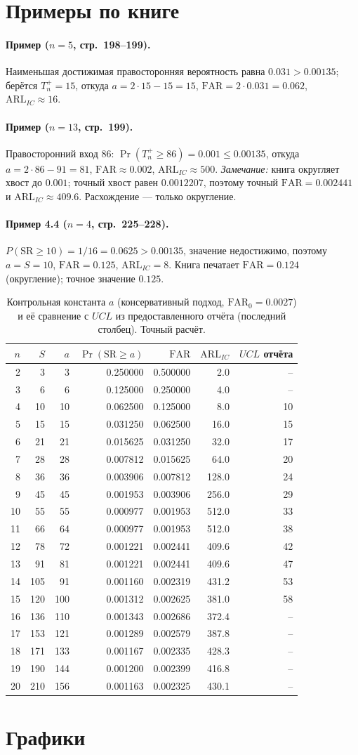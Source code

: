 \documentclass[11pt,a4paper]{article}
\newcommand{\SR}{\mathrm{SR}}
\newcommand{\FAR}{\mathrm{FAR}}
\newcommand{\ARL}{\mathrm{ARL}}
\newcommand{\FARz}{\FAR_0}
\def\srTable{%
2 & 3 & 3 & 0.250000 & 0.500000 & 2.0 & --\\
3 & 6 & 6 & 0.125000 & 0.250000 & 4.0 & --\\
4 & 10 & 10 & 0.062500 & 0.125000 & 8.0 & 10\\
5 & 15 & 15 & 0.031250 & 0.062500 & 16.0 & 15\\
6 & 21 & 21 & 0.015625 & 0.031250 & 32.0 & 17\\
7 & 28 & 28 & 0.007812 & 0.015625 & 64.0 & 20\\
8 & 36 & 36 & 0.003906 & 0.007812 & 128.0 & 24\\
9 & 45 & 45 & 0.001953 & 0.003906 & 256.0 & 29\\
10 & 55 & 55 & 0.000977 & 0.001953 & 512.0 & 33\\
11 & 66 & 64 & 0.000977 & 0.001953 & 512.0 & 38\\
12 & 78 & 72 & 0.001221 & 0.002441 & 409.6 & 42\\
13 & 91 & 81 & 0.001221 & 0.002441 & 409.6 & 47\\
14 & 105 & 91 & 0.001160 & 0.002319 & 431.2 & 53\\
15 & 120 & 100 & 0.001312 & 0.002625 & 381.0 & 58\\
16 & 136 & 110 & 0.001343 & 0.002686 & 372.4 & --\\
17 & 153 & 121 & 0.001289 & 0.002579 & 387.8 & --\\
18 & 171 & 133 & 0.001167 & 0.002335 & 428.3 & --\\
19 & 190 & 144 & 0.001200 & 0.002399 & 416.8 & --\\
20 & 210 & 156 & 0.001163 & 0.002325 & 430.1 & --\\}
\begin{document}
\section{Примеры по книге}

\paragraph{Пример ($n=5$, стр.~198--199).}
Наименьшая достижимая правосторонняя вероятность равна $0.031>0.00135$;
берётся $T_n^{+}=15$, откуда $a=2\cdot15-15=15$,
$\FAR=2\cdot0.031=0.062$, $\ARL_{IC}\approx16$.

\paragraph{Пример ($n=13$, стр.~199).}
Правосторонний вход $86$: $\Pr(T_n^{+}\ge86)=0.001\le0.00135$, откуда
$a=2\cdot86-91=81$, $\FAR\approx0.002$, $\ARL_{IC}\approx500$.
\emph{Замечание:} книга округляет хвост до $0.001$; точный хвост равен
$0.0012207$, поэтому точный $\FAR=0.002441$ и
$\ARL_{IC}\approx409.6$. Расхождение --- только округление.

\paragraph{Пример 4.4 ($n=4$, стр.~225--228).}
$P(\SR\ge10)=1/16=0.0625>0.00135$, значение недостижимо, поэтому
$a=S=10$, $\FAR=0.125$, $\ARL_{IC}=8$. Книга печатает $\FAR=0.124$
(округление); точное значение $0.125$.

\begin{table}[htbp]\centering
\caption{Контрольная константа $a$ (консервативный подход,
$\FARz=0.0027$) и её сравнение с $UCL$ из предоставленного отчёта
(последний столбец). Точный расчёт.}
\label{tab:srtable}
\begin{tabular}{rrrrrrr}
\toprule
$n$ & $S$ & $a$ & $\Pr(\SR\ge a)$ & $\FAR$ & $\ARL_{IC}$ & $UCL$ отчёта\\
\midrule
\srTable
\bottomrule
\end{tabular}
\end{table}

\section{Графики}
\end{document}
